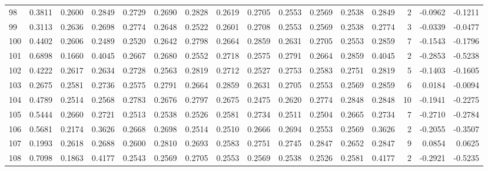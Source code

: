 \begin{tabular}{lrrrrrrrrrrrrrrr}
98  &      0.3811 &  0.2600 &  0.2849 &  0.2729 &  0.2690 &  0.2828 &  0.2619 &  0.2705 &  0.2553 &  0.2569 &   0.2538 &     0.2849 &      2 &                   -0.0962 &                    -0.1211 \\
99  &      0.3113 &  0.2636 &  0.2698 &  0.2774 &  0.2648 &  0.2522 &  0.2601 &  0.2708 &  0.2553 &  0.2569 &   0.2538 &     0.2774 &      3 &                   -0.0339 &                    -0.0477 \\
100 &      0.4402 &  0.2606 &  0.2489 &  0.2520 &  0.2642 &  0.2798 &  0.2664 &  0.2859 &  0.2631 &  0.2705 &   0.2553 &     0.2859 &      7 &                   -0.1543 &                    -0.1796 \\
101 &      0.6898 &  0.1660 &  0.4045 &  0.2667 &  0.2680 &  0.2552 &  0.2718 &  0.2575 &  0.2791 &  0.2664 &   0.2859 &     0.4045 &      2 &                   -0.2853 &                    -0.5238 \\
102 &      0.4222 &  0.2617 &  0.2634 &  0.2728 &  0.2563 &  0.2819 &  0.2712 &  0.2527 &  0.2753 &  0.2583 &   0.2751 &     0.2819 &      5 &                   -0.1403 &                    -0.1605 \\
103 &      0.2675 &  0.2581 &  0.2736 &  0.2575 &  0.2791 &  0.2664 &  0.2859 &  0.2631 &  0.2705 &  0.2553 &   0.2569 &     0.2859 &      6 &                    0.0184 &                    -0.0094 \\
104 &      0.4789 &  0.2514 &  0.2568 &  0.2783 &  0.2676 &  0.2797 &  0.2675 &  0.2475 &  0.2620 &  0.2774 &   0.2848 &     0.2848 &     10 &                   -0.1941 &                    -0.2275 \\
105 &      0.5444 &  0.2660 &  0.2721 &  0.2513 &  0.2538 &  0.2526 &  0.2581 &  0.2734 &  0.2511 &  0.2504 &   0.2665 &     0.2734 &      7 &                   -0.2710 &                    -0.2784 \\
106 &      0.5681 &  0.2174 &  0.3626 &  0.2668 &  0.2698 &  0.2514 &  0.2510 &  0.2666 &  0.2694 &  0.2553 &   0.2569 &     0.3626 &      2 &                   -0.2055 &                    -0.3507 \\
107 &      0.1993 &  0.2618 &  0.2688 &  0.2600 &  0.2810 &  0.2693 &  0.2583 &  0.2751 &  0.2745 &  0.2847 &   0.2652 &     0.2847 &      9 &                    0.0854 &                     0.0625 \\
108 &      0.7098 &  0.1863 &  0.4177 &  0.2543 &  0.2569 &  0.2705 &  0.2553 &  0.2569 &  0.2538 &  0.2526 &   0.2581 &     0.4177 &      2 &                   -0.2921 &                    -0.5235 \\

\end{tabular}
